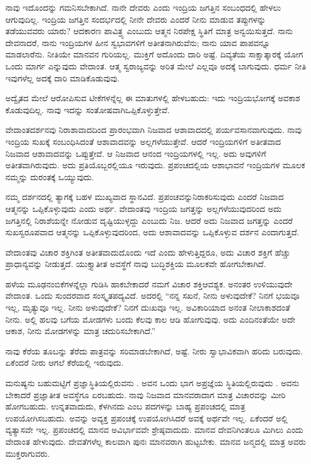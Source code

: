 ನಾವು ಇದೊಂದನ್ನು ಗಮನಿಸಬೇಕಾಗಿದೆ. ನಾನೇ ದೇವರು ಎಂದು ಇಂದ್ರಿಯ ಜಗತ್ತಿನ ಸಂಬಂಧದಲ್ಲಿ ಹೇಳಲು ಆಗುವುದಿಲ್ಲ. ಇಂದ್ರಿಯ ಜಗತ್ತಿನ ಸಂದರ್ಭದಲ್ಲಿ ನೀನೇ ದೇವರು ಎಂದರೆ ನೀನು ಮಾಡುವ ತಪ್ಪುಗಳನ್ನು ತಡೆಯುವವರು ಯಾರು? ಆದಕಾರಣ ಪಾವಿತ್ರ್ಯ ಎಂಬುದು ಆತ್ಮನ ನಿರಪೇಕ್ಷ ಸ್ಥಿತಿಗೆ ಮಾತ್ರ ಅನ್ವಯಿಸುತ್ತದೆ. ನಾನು ದೇವನಾದರೆ, ನಾನು ಇಂದ್ರಿಯಗಳ ಹೀನ ಸ್ವಭಾವಗಳಿಗೆ ಅತೀತನಾಗಿರುವೆನು; ನಾನು ಯಾವ ಪಾಪವನ್ನೂ ಮಾಡಲಾರೆನು. ನೀತಿಯೇ ಮಾನವನ ಗುರಿಯಲ್ಲ. ಮುಕ್ತಿಗೆ ಅದೊಂದು ದಾರಿ ಅಷ್ಟೆ. ದಿವ್ಯತೆಯ ಸಾಕ್ಷಾತ್ಕಾರಕ್ಕೆ ಯೋಗ ಒಂದು ಮಾರ್ಗ ಎನ್ನುವುದು ವೇದಾಂತ. ಆತ್ಮ ಸ್ವರಾಜ್ಯವನ್ನು ಅರಿತ ಮೇಲೆ ಎಲ್ಲವೂ ಅದಕ್ಕೆ ಬಾಗುವುದು. ಧರ್ಮ ನೀತಿ ಇವುಗಳೆಲ್ಲ ಅದಕ್ಕೆ ದಾರಿ ಮಾಡಿಕೊಡುವುವು.

ಅದ್ವೈತದ ಮೇಲೆ ಆರೋಪಿಸುವ ಟೀಕೆಗಳನ್ನೆಲ್ಲ ಈ ಮಾತುಗಳಲ್ಲಿ ಹೇಳಬಹುದು: ಇದು ಇಂದ್ರಿಯಭೋಗಕ್ಕೆ ಅವಕಾಶ ಕೊಡುವುದಿಲ್ಲ. ನಾವು ಇದನ್ನು ಸಂತೋಷವಾಗಿ\break ಒಪ್ಪಿಕೊಳ್ಳುತ್ತೇವೆ.

ವೇದಾಂತದರ್ಶನವು ನಿರಾಶಾವಾದದಿಂದ ಪ್ರಾರಂಭವಾಗಿ ನಿಜವಾದ ಆಶಾವಾದದಲ್ಲಿ ಪರ್ಯವಸಾನವಾಗುವುದು. ನಾವು ಇಂದ್ರಿಯ ಸುಖಕ್ಕೆ ಸಂಬಂಧಿಸಿದಂತೆ ಆಶಾವಾದವನ್ನು ಅಲ್ಲಗಳೆಯುತ್ತೇವೆ. ಆದರೆ ಇಂದ್ರಿಯಗಳಿಗೆ ಅತೀತವಾದ ನಿಜವಾದ ಆಶಾವಾದವನ್ನು ಒಪ್ಪುತ್ತೇವೆ. ಆ ನಿಜವಾದ ಆನಂದ ಇಂದ್ರಿಯಗಳಲ್ಲಿ ಇಲ್ಲ. ಅದು ಅವುಗಳಿಗೆ ಅತೀತವಾಗಿರುವುದು. ಅದು ಪ್ರತಿಯೊಬ್ಬರಲ್ಲಿಯೂ ಇರುವುದು. ಪ್ರಪಂಚದಲ್ಲಿಯ ಆಶಾಭಾವನೆ ಇಂದ್ರಿಯಗಳ ಮೂಲಕ ನಮ್ಮನ್ನು ದುರಂತಕ್ಕೆ ಒಯ್ಯುವುದು.

ನಮ್ಮ ದರ್ಶನದಲ್ಲಿ ತ್ಯಾಗಕ್ಕೆ ಬಹಳ ಮುಖ್ಯವಾದ ಸ್ಥಾನವಿದೆ. ಪ್ರಪಂಚವನ್ನು\break ನಿರಾಕರಿಸುವುದು ಎಂದರೆ ನಿಜವಾದ ಆತ್ಮನನ್ನು ಒಪ್ಪಿಕೊಳ್ಳುವುದು ಎಂದು ಅರ್ಥ. ವೇದಾಂತವು ಇಂದ್ರಿಯ ಜಗತ್ತನ್ನು ಅಲ್ಲಗಳೆಯುವುದರಿಂದ ಅದು ಜಗತ್ತಿನಲ್ಲಿ ನಿರಾಶೆಯನ್ನೇ ನೋಡುವ ದೃಷ್ಟಿಯುಳ್ಳದ್ದು ಎಂಬುದು ನಿಜ. ಆದರೆ ಅದು ನಿಜವಾದ ಜಗತ್ತನ್ನು ಎಂದರೆ ಸುಖಸ್ವರೂಪವಾದ ಆತ್ಮನನ್ನು ಒಪ್ಪಿಕೊಳ್ಳುವುದರಿಂದ, ಅದು ಆಶಾವಾದವನ್ನು ಒಪ್ಪಿಕೊಳ್ಳುವ ದರ್ಶನ ಎಂದಾಗುತ್ತದೆ.

ವೇದಾಂತವು ವಿಚಾರ ಶಕ್ತಿಗಿಂತ ಅತೀತವಾದುದೊಂದು ಇದೆ ಎಂದು ಹೇಳುತ್ತಿದ್ದರೂ, ಅದು ವಿಚಾರ ಶಕ್ತಿಗೆ ಹೆಚ್ಚು ಪ್ರಾಧಾನ್ಯವನ್ನು ನೀಡುತ್ತದೆ. ಯುಕ್ತ್ಯಾತೀತ ಅವಸ್ಥೆಗೆ ನಾವು ಬುದ್ಧಿಶಕ್ತಿಯ ಮೂಲಕವೇ ಹೋಗಬೇಕಾಗಿದೆ.

ಹಳೆಯ ಮೂಢನಂಬಿಕೆಗಳನ್ನೆಲ್ಲಾ ಗುಡಿಸಿ ಹಾಕಬೇಕಾದರೆ ನಮಗೆ ವಿಚಾರ ಶಕ್ತಿ\break ಆವಶ್ಯಕ. ಅನಂತರ ಉಳಿಯುವುದೇ ವೇದಾಂತ. ಒಂದು ಸುಂದರವಾದ ಸಂಸ್ಕೃತ\break ಪದ್ಯವಿದೆ. ಅದರಲ್ಲಿ “ನನ್ನ ಸಖನೆ, ನೀನು ಅಳುವುದೇಕೆ? ನಿನಗೆ ಭಯವೂ ಇಲ್ಲ, ಮೃತ್ಯುವೂ ಇಲ್ಲ. ನೀನು ಅಳುವುದೇಕೆ? ನಿನಗೆ ದುಃಖವೂ ಇಲ್ಲ. ಅವಿಕಾರಿಯಾದ ಅನಂತ ನೀಲಾಕಾಶದಂತೆ ನೀನು. ಅಲ್ಲಿ ಹಲವು ಬಗೆಯ ಮೋಡಗಳು ಬಂದು ಕೆಲವು ಕಾಲ ಆಡಿ ಹೋಗುವುವು. ಅದು ಎಂದಿನಂತೆಯೇ ಅದೇ ಆಕಾಶ, ನೀನು ಮೋಡಗಳನ್ನು ಮಾತ್ರ ಚದುರಿಸಬೇಕಾಗಿದೆ.”

ನಾವು ಕೆರೆಯ ತೂಬನ್ನು ತೆರೆದು ಪಾತ್ರವನ್ನು ಸರಿಮಾಡಬೇಕಾಗಿದೆ, ಅಷ್ಟೆ. ನೀರು ಸ್ವಾಭಾವಿಕವಾಗಿ ಹರಿದು ಬರುವುದು. ಏಕೆಂದರೆ ನೀರು ಆಗಲೆ ಕೆರೆಯಲ್ಲಿ ಇರುವುದು.

ಮನುಷ್ಯನು ಬಹುಮಟ್ಟಿಗೆ ಪ್ರಜ್ಞಾಸ್ಥಿತಿಯಲ್ಲಿರುವನು . ಅವನ ಒಂದು ಭಾಗ ಅಪ್ರಜ್ಞೆಯ ಸ್ಥಿತಿಯಲ್ಲಿರುವುದು . ಅವನು ಬೇಕಾದರೆ ಪ್ರಜ್ಞಾತೀತ ಅವಸ್ಥೆಗೂ  ಏರಬಹುದು. ನಾವು ನಿಜವಾದ ಮಾನವರಾದಾಗ ಮಾತ್ರ ವಿಚಾರವನ್ನು ಮೀರಿ ಹೋಗಬಹುದು. ಉನ್ನತವಾದುದು, ಕೆಳಗಿನದು ಎಂಬ ಪದಗಳನ್ನು ಬಾಹ್ಯ ಪ್ರಪಂಚದಲ್ಲಿ ಮಾತ್ರ ಉಪಯೋಗಿಸಬಹುದು. ಅವನ್ನು ಅವ್ಯಕ್ತ ಪ್ರಪಂಚಕ್ಕೆ ಉಪಯೋಗಿಸಿದರೆ ಅವಕ್ಕೆ ಅರ್ಥವೇ ಇಲ್ಲ. ಏಕೆಂದರೆ ಅಲ್ಲಿ ವ್ಯತ್ಯಾಸವೇ ಇಲ್ಲ. ಪ್ರಪಂಚದಲ್ಲಿ ಮಾನವ ಅವಿರ್ಭಾವವೇ ಶ್ರೇಷ್ಠವಾದುದು. ಮಾನವ ದೇವನಿಗಿಂತಲೂ ಮಿಗಿಲು ಎಂದು ವೇದಾಂತ ಹೇಳುವುದು. ದೇವತೆಗಳೆಲ್ಲ ಕಾಲವಾಗಿ ಪುನಃ ಮಾನವರಾಗಿ ಹುಟ್ಟಬೇಕು. ಮಾನವ ಜನ್ಮದಲ್ಲಿ ಮಾತ್ರ ಅವರು ಮುಕ್ತರಾಗುವರು.

